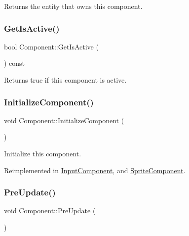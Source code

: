 Returns the entity that owns this component. \mbox{\label{class_component_acc8b4b096202b1b981973eee31bd682e}} 
\subsubsection{\texorpdfstring{Get\+Is\+Active()}{GetIsActive()}}
{\footnotesize\ttfamily bool Component\+::\+Get\+Is\+Active (\begin{DoxyParamCaption}{ }\end{DoxyParamCaption}) const\hspace{0.3cm}{\ttfamily [inline]}}

Returns true if this component is active. \mbox{\label{class_component_a65053e7e92ff6344e6b028111e43c3c9}} 
\subsubsection{\texorpdfstring{Initialize\+Component()}{InitializeComponent()}}
{\footnotesize\ttfamily void Component\+::\+Initialize\+Component (\begin{DoxyParamCaption}{ }\end{DoxyParamCaption})\hspace{0.3cm}{\ttfamily [virtual]}}

Initialize this component. 

Reimplemented in \mbox{\hyperlink{class_input_component_ad4262870839371f79747db5b6faf25a7}{Input\+Component}}, and \mbox{\hyperlink{class_sprite_component_af4040c615bebb4aea20f274f77e36733}{Sprite\+Component}}.

\mbox{\label{class_component_a7866088cbcf6713821951955eadc85ce}} 
\subsubsection{\texorpdfstring{Pre\+Update()}{PreUpdate()}}
{\footnotesize\ttfamily void Component\+::\+Pre\+Update (\begin{DoxyParamCaption}{ }\end{DoxyParamCaption})\hspace{0.3cm}{\ttfamily [virtual]}}

